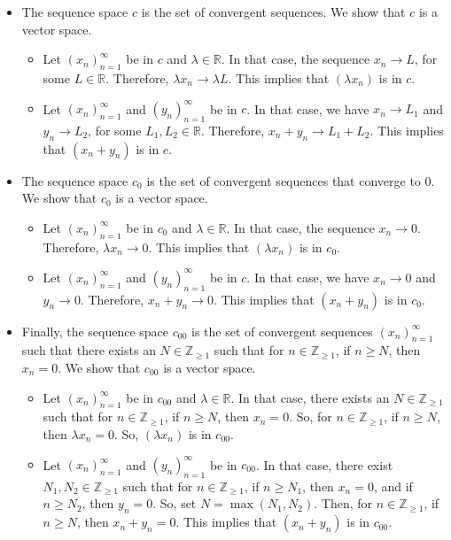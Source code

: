 \documentclass[a4paper, openany]{memoir}
\theoremstyle{definition}
\theoremstyle{plain}
\begin{document}
\begin{itemize}
    \item The sequence space $c$ is the set of convergent sequences. We show that $c$ is a vector space.
    \begin{itemize}
        \item Let $(x_n)_{n=1}^\infty$ be in $c$ and $\lambda \in \mathbb{R}$. In that case, the sequence $x_n \to L$, for some $L \in \mathbb{R}$. Therefore, $\lambda x_n \to \lambda L$. This implies that $(\lambda x_n)$ is in $c$.
        \item Let $(x_n)_{n=1}^\infty$ and $(y_n)_{n=1}^\infty$ be in $c$. In that case, we have $x_n \to L_1$ and $y_n \to L_2$, for some $L_1, L_2 \in \mathbb{R}$. Therefore, $x_n + y_n \to L_1 + L_2$. This implies that $(x_n + y_n)$ is in $c$.
    \end{itemize}

    \item The sequence space $c_0$ is the set of convergent sequences that converge to $0$. We show that $c_0$ is a vector space.
    \begin{itemize}
        \item Let $(x_n)_{n=1}^\infty$ be in $c_0$ and $\lambda \in \mathbb{R}$. In that case, the sequence $x_n \to 0$. Therefore, $\lambda x_n \to 0$. This implies that $(\lambda x_n)$ is in $c_0$.
        \item Let $(x_n)_{n=1}^\infty$ and $(y_n)_{n=1}^\infty$ be in $c$. In that case, we have $x_n \to 0$ and $y_n \to 0$. Therefore, $x_n + y_n \to 0$. This implies that $(x_n + y_n)$ is in $c_0$.
    \end{itemize}

    \item Finally, the sequence space $c_{00}$ is the set of convergent sequences $(x_n)_{n=1}^\infty$ such that there exists an $N \in \mathbb{Z}_{\geq 1}$ such that for $n \in \mathbb{Z}_{\geq 1}$, if $n \geq N$, then $x_n = 0$. We show that $c_{00}$ is a vector space.
    \begin{itemize}
        \item Let $(x_n)_{n=1}^\infty$ be in $c_{00}$ and $\lambda \in \mathbb{R}$. In that case, there exists an $N \in \mathbb{Z}_{\geq 1}$ such that for $n \in \mathbb{Z}_{\geq 1}$, if $n \geq N$, then $x_n = 0$. So, for $n \in \mathbb{Z}_{\geq 1}$, if $n \geq N$, then $\lambda x_n = 0$. So, $(\lambda x_n)$ is in $c_{00}$.
        \item Let $(x_n)_{n=1}^\infty$ and $(y_n)_{n=1}^\infty$ be in $c_{00}$. In that case, there exist $N_1, N_2 \in \mathbb{Z}_{\geq 1}$ such that for $n \in \mathbb{Z}_{\geq 1}$, if $n \geq N_1$, then $x_n = 0$, and if $n \geq N_2$, then $y_n = 0$. So, set $N = \max(N_1, N_2)$. Then, for $n \in \mathbb{Z}_{\geq 1}$, if $n \geq N$, then $x_n + y_n = 0$. This implies that $(x_n + y_n)$ is in $c_{00}$.
    \end{itemize}
\end{itemize}
\end{document}
